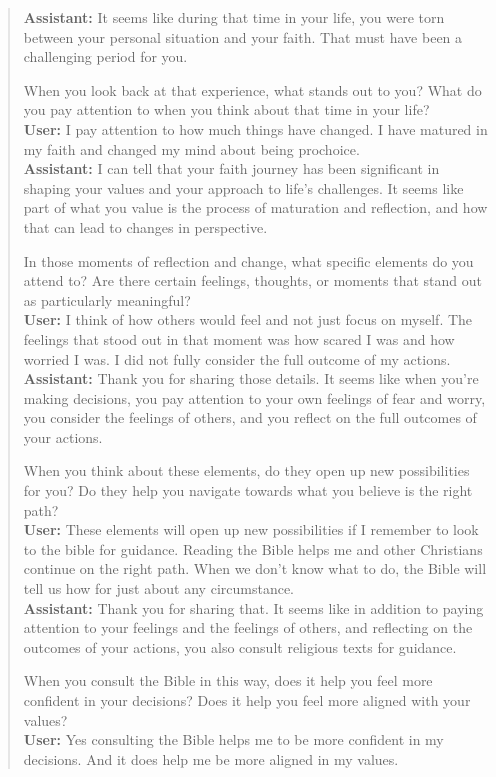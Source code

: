 \documentclass{article}
\theoremstyle{definition}
\newcommand{\assistant}[1]{\textbf{Assistant:} #1\\}
\newcommand{\user}[1]{\textbf{User:} #1\\}
\begin{document}
\begin{quotation}
\assistant{It seems like during that time in your life, you were torn between your personal situation and your faith. That must have been a challenging period for you. 

When you look back at that experience, what stands out to you? What do you pay attention to when you think about that time in your life?}

\user{I pay attention to how much things have changed. I have matured in my faith and changed my mind about being prochoice.}

\assistant{I can tell that your faith journey has been significant in shaping your values and your approach to life's challenges. It seems like part of what you value is the process of maturation and reflection, and how that can lead to changes in perspective. 

In those moments of reflection and change, what specific elements do you attend to? Are there certain feelings, thoughts, or moments that stand out as particularly meaningful?}

\user{I think of how others would feel and not just focus on myself. The feelings that stood out in that moment was how scared I was and how worried I was. I did not fully consider the full outcome of my actions.}

\assistant{Thank you for sharing those details. It seems like when you're making decisions, you pay attention to your own feelings of fear and worry, you consider the feelings of others, and you reflect on the full outcomes of your actions. 

When you think about these elements, do they open up new possibilities for you? Do they help you navigate towards what you believe is the right path?}

\user{These elements will open up new possibilities if I remember to look to the bible for guidance. Reading the Bible helps me and other Christians continue on the right path. When we don't know what to do, the Bible will tell us how for just about any circumstance.}

\assistant{Thank you for sharing that. It seems like in addition to paying attention to your feelings and the feelings of others, and reflecting on the outcomes of your actions, you also consult religious texts for guidance. 

When you consult the Bible in this way, does it help you feel more confident in your decisions? Does it help you feel more aligned with your values?}

\user{Yes consulting the Bible helps me to be more confident in my decisions. And it does help me be more aligned in my values.}


\end{quotation}
\end{document}

